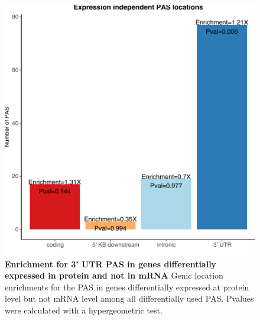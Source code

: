 \begin{figure}[!htb]
\centering
\includegraphics[width=5in]{img/ch03/Fig6-figSup1.pdf}
\caption[Enrichment for 3' UTR PAS in genes differentially expressed in protein and not in mRNA]{\textbf{Enrichment for 3' UTR PAS in genes differentially expressed in protein and not in mRNA} Genic location enrichments for the PAS in genes differentially expressed at protein level but not mRNA level among all differentially used PAS. Pvalues were calculated with a hypergeometric test.}
\label{fig:ch03-dpnotE}
\end{figure}
\clearpage


